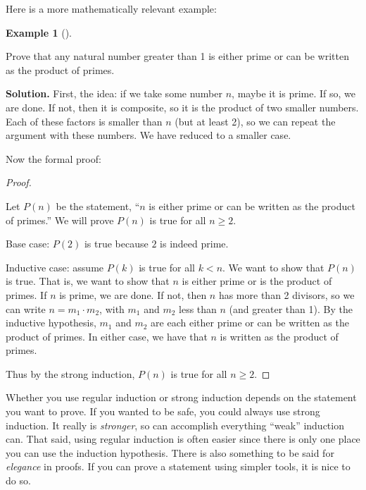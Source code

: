 \documentclass[10pt,]{book}
\theoremstyle{plain}
\theoremstyle{definition}
\newtheorem{example}[theorem]{Example}
\theoremstyle{definition}
\theoremstyle{definition}
\numberwithin{equation}{chapter}
\newcommand{\lt}{ < }
\begin{document}
Here is a more mathematically relevant example:
%
\begin{example}[]\label{example-82}

Prove that any natural number greater than 1 is either prime or can be written as the product of primes.
%
\par\medskip\noindent%
\textbf{Solution.}\quad
First, the idea: if we take some number \(n\), maybe it is prime. If so, we are done. If not, then it is composite, so it is the product of two smaller numbers. Each of these factors is smaller than \(n\) (but at least 2), so we can repeat the argument with these numbers. We have reduced to a smaller case.
%
\par

Now the formal proof:
%
\begin{proof}\hypertarget{proof-18}{}

Let \(P(n)\) be the statement, ``\(n\) is either prime or can be written as the product of primes.'' We will prove \(P(n)\) is true for all \(n \ge 2\).
%
\par

Base case: \(P(2)\) is true because \(2\) is indeed prime.
%
\par

Inductive case: assume \(P(k)\) is true for all \(k \lt  n\). We want to show that \(P(n)\) is true. That is, we want to show that \(n\) is either prime or is the product of primes. If \(n\) is prime, we are done. If not, then \(n\) has more than 2 divisors, so we can write \(n = m_1 \cdot m_2\), with \(m_1\) and \(m_2\) less than \(n\) (and greater than 1). By the inductive hypothesis, \(m_1\) and \(m_2\) are each either prime or can be written as the product of primes. In either case, we have that \(n\) is written as the product of primes.
%
\par

Thus by the strong induction, \(P(n)\) is true for all \(n \ge 2\).
%
\end{proof}
\end{example}
\par

Whether you use regular induction or strong induction depends on the statement you want to prove. If you wanted to be safe, you could always use strong induction. It really is \emph{stronger}, so can accomplish everything ``weak'' induction can. That said, using regular induction is often easier since there is only one place you can use the induction hypothesis. There is also something to be said for \emph{elegance} in proofs. If you can prove a statement using simpler tools, it is nice to do so.
%
\par
\end{document}
